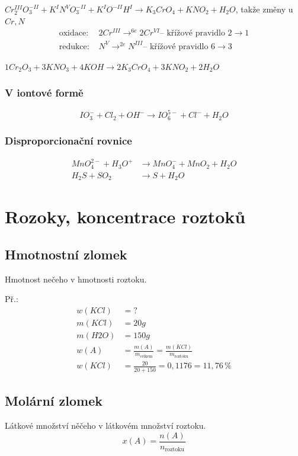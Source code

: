 \documentclass{article}
\begin{document}
$Cr_2^{III}O_3^{-II} + K^{I}N^{V}O_3^{-II} + K^{I}O^{-II}H^{I} \rightarrow K_3CrO_4 + KNO_2 + H_2O$, takže změny u $Cr, N$
\begin{align*}
  \text{oxidace: }&2Cr^{III}\rightarrow^{6e}2Cr^{VI} \text{-- křížové pravidlo } 2 \rightarrow 1\\
  \text{redukce: }&N^{V}\rightarrow^{2e}N^{III} \text{-- křížové pravidlo } 6 \rightarrow 3
\end{align*}


$\textit{1}Cr_2O_3 + \textit{3}KNO_3 + 4KOH \rightarrow 2K_3CrO_4 + 3KNO_2 + 2H_2O$

\subsubsection{V iontové formě}
\[IO_3^{-}+Cl_2 + OH^{-} \rightarrow IO_6^{5-} + Cl^{-}+ H_2O\]

\subsubsection{Disproporcionační rovnice}
\begin{align*}
  MnO_4^{2-}+ H_3O^{+} &\rightarrow MnO_4^{-} + MnO_2 + H_2O\\
  H_2S + SO_2 &\rightarrow S + H_2O
\end{align*}

\section{Rozoky, koncentrace roztoků}
\subsection{Hmotnostní zlomek}
Hmotnost nečeho v hmotnosti roztoku.

Př.:
\begin{align*}
  w(KCl) &= ?\\
  m(KCl) &= 20g\\
  m(H2O) &= 150g\\
  w(A) &= \frac{m(A)}{m_\text{celkem}} = \frac{m(KCl)}{m_{\text{roztoku}}}\\
  w(KCl) &= \frac{20}{20+150}=0,1176= 11,76\,\%
\end{align*}

\subsection{Molární zlomek}
Látkové množství něčeho v látkovém množství roztoku.
\[
x(A) = \frac{n(A)}{n_\text{roztoku}}
\]
\end{document}
